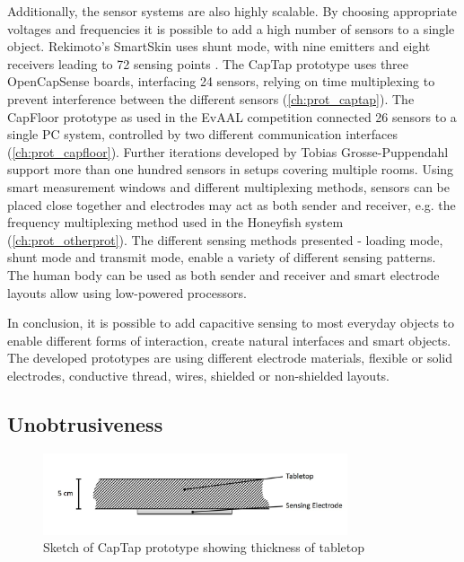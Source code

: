 Additionally, the sensor systems are also highly scalable. By choosing appropriate voltages and frequencies it is possible to add a high number of sensors to a single object. Rekimoto's SmartSkin uses shunt mode, with nine emitters and eight receivers leading to 72 sensing points \cite{rekimoto2002smartskin}. The CapTap prototype uses three OpenCapSense boards, interfacing 24 sensors, relying on time multiplexing to prevent interference between the different sensors (\ref{ch:prot_captap}). The CapFloor prototype as used in the EvAAL competition connected 26 sensors to a single PC system, controlled by two different communication interfaces (\ref{ch:prot_capfloor}). Further iterations developed by Tobias Grosse-Puppendahl support more than one hundred sensors in setups covering multiple rooms. Using smart measurement windows and different multiplexing methods, sensors can be placed close together and electrodes may act as both sender and receiver, e.g. the frequency multiplexing method used in the Honeyfish system \cite{grosse2012honey} (\ref{ch:prot_otherprot}). The different sensing methods presented - loading mode, shunt mode and transmit mode, enable a variety of different sensing patterns. The human body can be used as both sender and receiver and smart electrode layouts allow using low-powered processors. 

In conclusion, it is possible to add capacitive sensing to most everyday objects to enable different forms of interaction, create natural interfaces and smart objects. The developed prototypes are using different electrode materials, flexible or solid electrodes, conductive thread, wires, shielded or non-shielded layouts.
 
\subsection{Unobtrusiveness}
\begin{figure}[ht]
\centering
\includegraphics[width=0.8\textwidth]{images/eval_unobtrusive}
\caption{Sketch of CapTap prototype showing thickness of tabletop}
\label{fig:eval_unobtrusive}
\end{figure}

